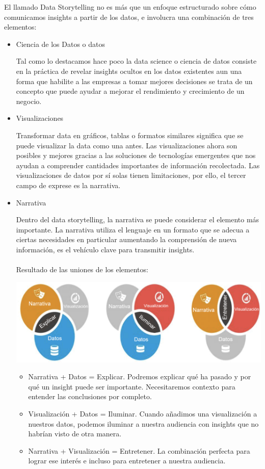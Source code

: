 \documentclass[preprint,12pt]{elsarticle}
\begin{document}
	El llamado Data Storytelling no es más que un enfoque estructurado sobre cómo comunicamos insights a partir de los datos, e involucra una combinación de tres elementos: 
	\begin{itemize}
		\item Ciencia de los Datos o datos
			
		Tal como lo destacamos hace poco la data science o ciencia de datos consiste en la práctica de revelar insights ocultos en los datos existentes aun una forma que habilite a las empresas a tomar mejores decisiones se trata de un concepto que puede ayudar a mejorar el rendimiento y crecimiento de un negocio.
		
		\item Visualizaciones
		
		Transformar data en gráficos, tablas o formatos similares significa que se puede visualizar la data como una antes. Las visualizaciones ahora son posibles y mejores gracias a las soluciones de tecnologías emergentes que nos ayudan a comprender cantidades importantes de información recolectada.  Las visualizaciones de datos por sí solas tienen limitaciones, por ello, el tercer campo de exprese es la narrativa.
		
		\item Narrativa
		
		Dentro del data storytelling, la narrativa se puede considerar el elemento más importante. La narrativa utiliza el lenguaje en un formato que se adecua a ciertas necesidades en particular aumentando la comprensión de nueva información, es el vehículo clave para transmitir insights.\\
		\\
		Resultado de las uniones de los elementos:
		
		\begin{center}
			\includegraphics[width=13cm]{./Imagenes/img1} 
		\end{center}
		
			\begin{itemize}
				\item Narrativa + Datos = Explicar. Podremos explicar qué ha pasado y por qué un insight puede ser importante. Necesitaremos contexto para entender las conclusiones por completo.
				\item Visualización + Datos = Iluminar. Cuando añadimos una visualización a nuestros datos, podemos iluminar a nuestra audiencia con insights que no habrían visto de otra manera.
				\item Narrativa + Visualización = Entretener. La combinación perfecta para lograr ese interés e incluso para entretener a nuestra audiencia.
			\end{itemize}

	\end{itemize}
\end{document}
